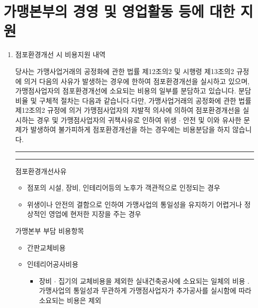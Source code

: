 \documentclass[a5paper,10pt]{oblivoir}
\newcommand\crule[3][black]{\textcolor{#1}{\rule{#2}{#3}}}
\begin{document}
\section{ 가맹본부의 경영 및 영업활동 등에 대한 지원}
\begin{enumerate}
\item 점포환경개선 시 비용지원 내역

당사는 가맹사업거래의 공정화에 관한 법률 제12조의2 및 시행령 제13조의2 규정에 의거 다음의 사유가 발생하는 경우에 한하여 점포환경개선을 실시하고 있으며, 가맹점사업자의 점포환경개선에 소요되는 비용의 일부를 분담하고 있습니다. 분담비율 및 구체적 절차는 다음과 같습니다.다만, 가맹사업거래의 공정화에 관한 법률 제12조의2 규정에 의거 가맹점사업자의 자발적 의사에 의하여 점포환경개선을 실시하는 경우 및 가맹점사업자의 귀책사유로 인하여 위생 $\cdot$ 안전 및 이와 유사한 문제가 발생하여 불가피하게 점포환경개선을 하는 경우에는 비용분담을 하지 않습니다.

\newpage
\begin{center}
\crule[red]{4cm}{0.1cm} \crule[blue]{4cm}{0.1cm}
\end{center}

\begin{tiny}
\begin{Form}
\def\LayoutCheckField#1#2{%
  \parbox[c][5mm]{5mm}{\centering\footnotesize\strut #1\\#2}%
}
\def\LayoutCheckField#1#2{%
  \makebox[0pt][l]{%
    \makebox[5mm][c]{\footnotesize\strut #1}%
  }%
  #2%
}
\def\DefaultHeightofCheckBox{5mm}
\def\DefaultWidthofCheckBox{5mm}

\rule{0cm}{.5cm}

 점포환경개선사유

\noindent\dotfill 
\begin{itemize}
\item  점포의 시설, 장비, 인테리어등의 노후가 객관적으로 인정되는 경우
\item 위생이나 안전의 결함으로 인하여 가맹사업의 통일성을 유지하기 어렵거나 정상적인 영업에 현저한 지장을 주는 경우
\end{itemize}

 가맹본부 부담 비용항목

\noindent\dotfill 
\begin{itemize}
\item 간판교체비용
\item 인테리어공사비용
\begin{itemize}
\item 장비 $\cdot$ 집기의 교체비용을 제외한 실내건축공사에 소요되는 일체의 비용
. 가맹사업의 통일성과 무관하게 가맹점사업자가 추가공사를 실시함에 따라소요되는 비용은 제외
\end{itemize}
\end{itemize}


\end{Form}
\end{tiny}
\end{enumerate}
\end{document}
